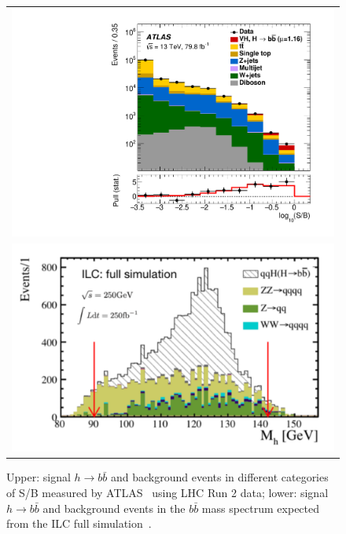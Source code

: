\begin{figure}
\begin{tabular}[c]{c}
\includegraphics[width=0.85\hsize]{chapters/figures/ATLAS_VH_bb.pdf} \\
\includegraphics[width=0.85\hsize]{chapters/figures/qqH_bb250_ILC.pdf}
\end{tabular}
  \caption{Upper: signal $h\to b\bar{b}$ and background events in different categories of S/B
  measured by ATLAS~\cite{} using LHC Run 2 data; lower: signal $h\to b\bar{b}$ 
  and background events in the $b\bar{b}$ mass spectrum expected from the 
  ILC full simulation~\cite{}.}
  \label{fig:LHCILCHbb}
\end{figure}